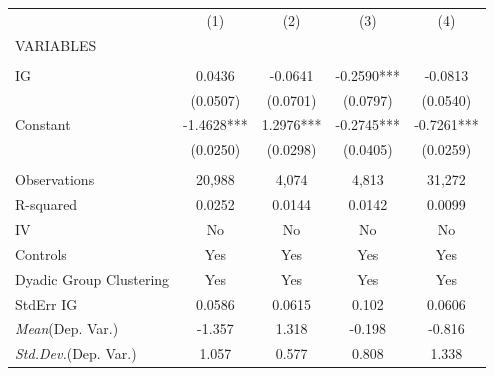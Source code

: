 \documentclass[]{article}
\begin{document}
\begin{tabular}{lcccc} \hline
 & (1) & (2) & (3) & (4) \\
VARIABLES &  &  &  &  \\ \hline
 &  &  &  &  \\
IG & 0.0436 & -0.0641 & -0.2590*** & -0.0813 \\
 & (0.0507) & (0.0701) & (0.0797) & (0.0540) \\
Constant & -1.4628*** & 1.2976*** & -0.2745*** & -0.7261*** \\
 & (0.0250) & (0.0298) & (0.0405) & (0.0259) \\
 &  &  &  &  \\
Observations & 20,988 & 4,074 & 4,813 & 31,272 \\
R-squared & 0.0252 & 0.0144 & 0.0142 & 0.0099 \\
IV & No & No & No & No \\
Controls & Yes & Yes & Yes & Yes \\
Dyadic Group Clustering & Yes & Yes & Yes & Yes \\
StdErr IG & 0.0586 & 0.0615 & 0.102 & 0.0606 \\
\textit{Mean}(Dep. Var.) & -1.357 & 1.318 & -0.198 & -0.816 \\
 \textit{Std.Dev.}(Dep. Var.) & 1.057 & 0.577 & 0.808 & 1.338 \\ \hline
\end{tabular}
\end{document}
